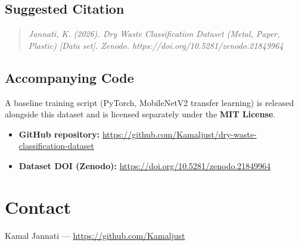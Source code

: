 \documentclass[11pt]{article}
\begin{document}
\subsection{Suggested Citation}
\begin{quote}
\itshape
Jannati, K. (2026). Dry Waste Classification Dataset (Metal, Paper,
Plastic) [Data set]. Zenodo. https://doi.org/10.5281/zenodo.21849964
\end{quote}

\subsection{Accompanying Code}
A baseline training script (PyTorch, MobileNetV2 transfer learning) is released alongside this dataset and is licensed separately under the \textbf{MIT License}.

\begin{itemize}
    \item \textbf{GitHub repository:} \url{https://github.com/Kamaljust/dry-waste-classification-dataset}
    \item \textbf{Dataset DOI (Zenodo):} \url{https://doi.org/10.5281/zenodo.21849964}
\end{itemize}

\section{Contact}
Kamal Jannati --- \url{https://github.com/Kamaljust}
\end{document}
